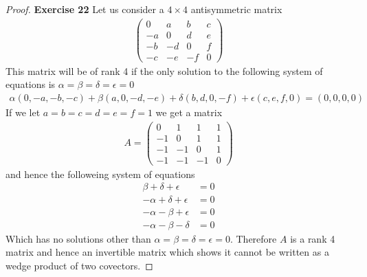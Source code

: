 \documentclass[11pt]{article}
\theoremstyle{definition}
\begin{document}
\begin{proof}{\textbf{Exercise 22}}
    Let us consider a $4\times4$ antisymmetric matrix
    \begin{align*}
        \begin{pmatrix}
            0 & a & b & c\\
            -a & 0 & d & e\\
            -b & -d & 0 & f\\
            -c & -e & -f & 0
        \end{pmatrix}
    \end{align*}
    This matrix will be of rank 4 if the only solution to the following
    system of equations is $\alpha = \beta = \delta = \epsilon = 0$
    \begin{align*}
        \alpha(0, -a, -b, -c) + \beta(a, 0, -d, -e) + \delta(b, d, 0, -f)
        + \epsilon(c, e, f, 0) = (0, 0, 0, 0)
    \end{align*}
    If we let $a = b = c = d = e = f = 1$ we get a matrix
    \begin{align*}
        A = 
        \begin{pmatrix}
            0 & 1 & 1 & 1\\
            -1 & 0 & 1 & 1\\
            -1 & -1 & 0 & 1\\
            -1 & -1 & -1 & 0
        \end{pmatrix}
    \end{align*}
    and hence the followeing system of equations
    \begin{align*}
        \beta + \delta + \epsilon &= 0\\
        -\alpha + \delta + \epsilon &= 0\\
        -\alpha - \beta + \epsilon &= 0\\
        -\alpha - \beta - \delta &= 0
    \end{align*}
    Which has no solutions other than $\alpha = \beta = \delta = \epsilon = 0$.
    Therefore $A$ is a rank 4 matrix and hence an invertible matrix which
    shows it cannot be written as a wedge product of two covectors.


\end{proof}
\end{document}

